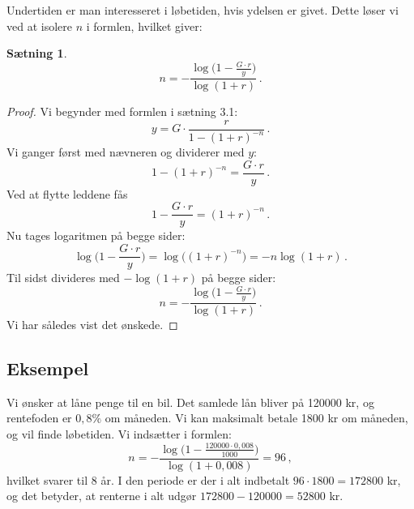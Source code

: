 \documentclass[12pt,oneside,a4paper]{article}
\newtheorem{thm}{Sætning}[section]
\begin{document}
Undertiden er man interesseret i løbetiden, hvis ydelsen er givet.
Dette løser vi ved at isolere $n$ i formlen, hvilket giver:
\begin{tcolorbox}
\begin{thm}
\[
    n = -\frac{\log\big(1-\frac{G\cdot r}{y}\big)}{\log(1+r)} \,.
\]
\end{thm}
\begin{proof}
Vi begynder med formlen i sætning 3.1:
\[
    y = G\cdot\frac{r}{1-(1+r)^{-n}}\,.
\]
Vi ganger først med nævneren og dividerer med $y$:
\[
1-(1+r)^{-n} = \frac{G\cdot r}{y}\,.
\]
Ved at flytte leddene fås
\[
1 - \frac{G\cdot r}{y} =(1+r)^{-n}\,.
\]
Nu tages logaritmen på begge sider:
\[
\log\Big(1 - \frac{G\cdot r}{y}\Big) =\log\Big((1+r)^{-n}\Big) = -n\log(1+r)\,.
\]
Til sidst divideres med $-\log(1+r)$ på begge sider:
\[
n = -\frac{\log\big(1-\frac{G\cdot r}{y}\big)}{\log(1+r)} \,.
\]
Vi har således vist det ønskede.
\end{proof}
\end{tcolorbox}

\begin{tcolorbox}
\subsection*{Eksempel}
Vi ønsker at låne penge til en bil. Det samlede lån bliver på 120000 kr, og
rentefoden er $0,8\%$ om måneden. Vi kan maksimalt betale 1800 kr om
måneden, og vil finde løbetiden.  Vi indsætter i formlen:
\[
n = -\frac{\log\big(1-\frac{120000\cdot0,008}{1000}\big)}{\log(1+0,008)} = 96 \,,
\]
hvilket svarer til 8 år.
I den periode er der i alt indbetalt $96\cdot 1800 = 172800$ kr, og det betyder,
at renterne i alt udgør $172800-120000 = 52800$ kr.
\end{tcolorbox}
\end{document}
